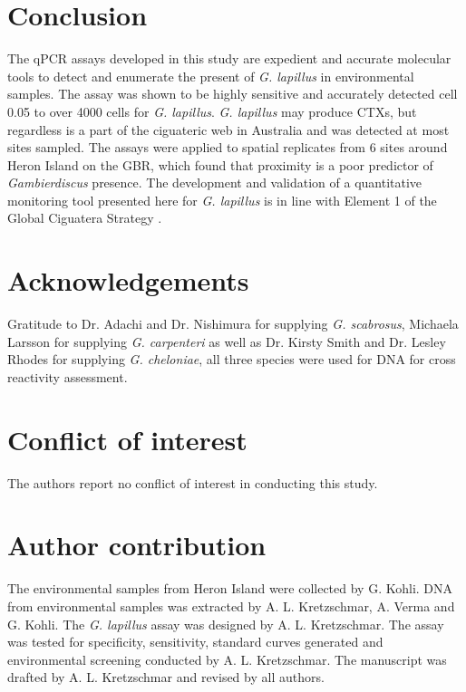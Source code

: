 \documentclass[12pt]{article}
\begin{document}
\section*{Conclusion}
The qPCR assays developed in this study are expedient and accurate molecular tools to detect and enumerate the present of \emph{G. lapillus} %
in environmental samples. 
The assay was shown to be highly sensitive and accurately detected cell 0.05 to over 4000 cells for \emph{G. lapillus}. %
\emph{G. lapillus} may produce CTXs, but regardless is a part of the ciguateric web in Australia and was detected at most sites sampled.
The assays were applied to spatial replicates from 6 sites around Heron Island on the GBR, which found that proximity is a poor predictor of \textit{Gambierdiscus} presence. 
The development and validation of a quantitative monitoring tool presented here for \textit{G. lapillus} is in line with Element 1 of the Global Ciguatera Strategy \cite{globalcig}.

 \section*{Acknowledgements}
Gratitude to Dr. Adachi and Dr. Nishimura for supplying \emph{G. scabrosus}, Michaela Larsson for supplying \emph{G. carpenteri} as well as Dr. Kirsty Smith and Dr. Lesley Rhodes for supplying \emph{G. cheloniae}, all three species were used for DNA for cross reactivity assessment. 

\section*{Conflict of interest}
The authors report no conflict of interest in conducting this study.

\section*{Author contribution}
The environmental samples from Heron Island were collected by G. Kohli. 
DNA from environmental samples was extracted by A. L. Kretzschmar, A. Verma and G. Kohli. %
The \emph{G. lapillus} assay was designed by A. L. Kretzschmar. 
The assay was tested for specificity, sensitivity, standard curves generated and environmental screening conducted by A. L. Kretzschmar. 
The manuscript was drafted by A. L. Kretzschmar and revised by all authors.

\FloatBarrier
\newpage
%
%


\end{document}
